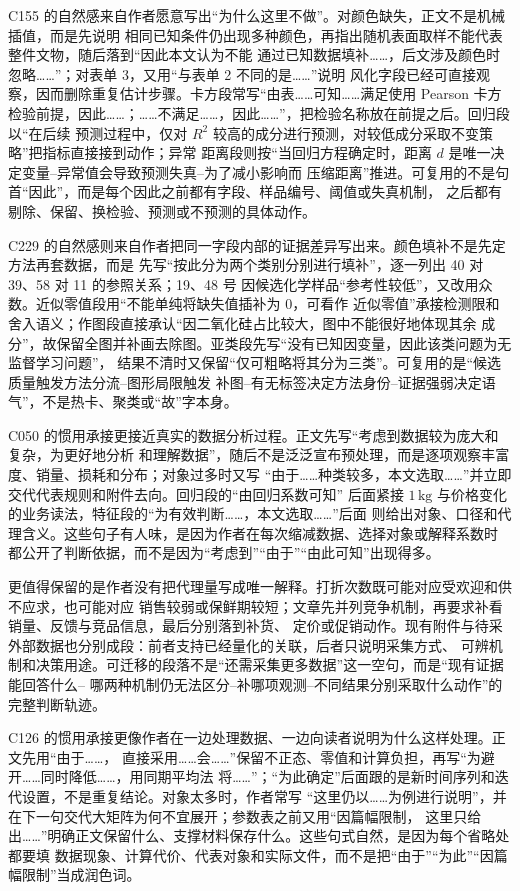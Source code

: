 \documentclass[UTF8,a4paper,12pt]{ctexart}
\begin{document}
C155 的自然感来自作者愿意写出“为什么这里不做”。对颜色缺失，正文不是机械插值，而是先说明
相同已知条件仍出现多种颜色，再指出随机表面取样不能代表整件文物，随后落到“因此本文认为不能
通过已知数据填补……，后文涉及颜色时忽略……”；对表单 3，又用“与表单 2 不同的是……”说明
风化字段已经可直接观察，因而删除重复估计步骤。卡方段常写“由表……可知……满足使用 Pearson
卡方检验前提，因此……；……不满足……，因此……”，把检验名称放在前提之后。回归段以“在后续
预测过程中，仅对 $R^2$ 较高的成分进行预测，对较低成分采取不变策略”把指标直接接到动作；异常
距离段则按“当回归方程确定时，距离 $d$ 是唯一决定变量--异常值会导致预测失真--为了减小影响而
压缩距离”推进。可复用的不是句首“因此”，而是每个因此之前都有字段、样品编号、阈值或失真机制，
之后都有剔除、保留、换检验、预测或不预测的具体动作。

C229 的自然感则来自作者把同一字段内部的证据差异写出来。颜色填补不是先定方法再套数据，而是
先写“按此分为两个类别分别进行填补”，逐一列出 40 对 39、58 对 11 的参照关系；19、48 号
因候选化学样品“参考性较低”，又改用众数。近似零值段用“不能单纯将缺失值插补为 0，可看作
近似零值”承接检测限和舍入语义；作图段直接承认“因二氧化硅占比较大，图中不能很好地体现其余
成分”，故保留全图并补画去除图。亚类段先写“没有已知因变量，因此该类问题为无监督学习问题”，
结果不清时又保留“仅可粗略将其分为三类”。可复用的是“候选质量触发方法分流--图形局限触发
补图--有无标签决定方法身份--证据强弱决定语气”，不是热卡、聚类或“故”字本身。

C050 的惯用承接更接近真实的数据分析过程。正文先写“考虑到数据较为庞大和复杂，为更好地分析
和理解数据”，随后不是泛泛宣布预处理，而是逐项观察丰富度、销量、损耗和分布；对象过多时又写
“由于……种类较多，本文选取……”并立即交代代表规则和附件去向。回归段的“由回归系数可知”
后面紧接 $1\,\mathrm{kg}$ 与价格变化的业务读法，特征段的“为有效判断……，本文选取……”后面
则给出对象、口径和代理含义。这些句子有人味，是因为作者在每次缩减数据、选择对象或解释系数时
都公开了判断依据，而不是因为“考虑到”“由于”“由此可知”出现得多。

更值得保留的是作者没有把代理量写成唯一解释。打折次数既可能对应受欢迎和供不应求，也可能对应
销售较弱或保鲜期较短；文章先并列竞争机制，再要求补看销量、反馈与竞品信息，最后分别落到补货、
定价或促销动作。现有附件与待采外部数据也分别成段：前者支持已经量化的关联，后者只说明采集方式、
可辨机制和决策用途。可迁移的段落不是“还需采集更多数据”这一空句，而是“现有证据能回答什么--
哪两种机制仍无法区分--补哪项观测--不同结果分别采取什么动作”的完整判断轨迹。

C126 的惯用承接更像作者在一边处理数据、一边向读者说明为什么这样处理。正文先用“由于……，
直接采用……会……”保留不正态、零值和计算负担，再写“为避开……同时降低……，用同期平均法
将……”；“为此确定”后面跟的是新时间序列和迭代设置，不是重复结论。对象太多时，作者常写
“这里仍以……为例进行说明”，并在下一句交代大矩阵为何不宜展开；参数表之前又用“因篇幅限制，
这里只给出……”明确正文保留什么、支撑材料保存什么。这些句式自然，是因为每个省略处都要填
数据现象、计算代价、代表对象和实际文件，而不是把“由于”“为此”“因篇幅限制”当成润色词。
\end{document}
